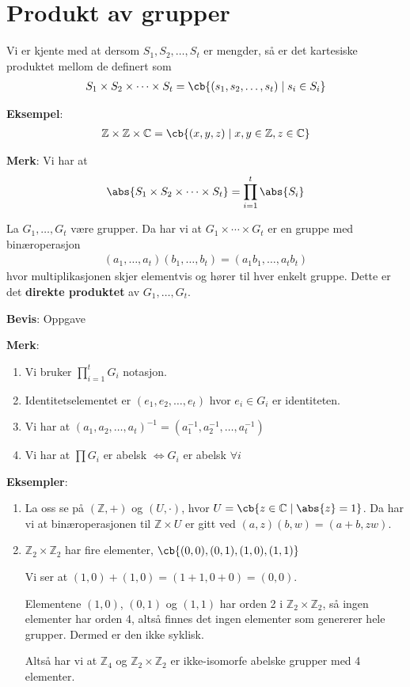 \section{Produkt av grupper}
Vi er kjente med at dersom $S_1, S_2, \dots, S_t$ er mengder, så er det kartesiske produktet
mellom de definert som
\begin{align}
	S_1\times S_2\times \cdots\times S_t = \cb{(s_1,s_2,\dots,s_t)\mid s_i\in S_i}
\end{align}

\textbf{Eksempel}:
\begin{align}
	\mathbb{Z}\times\mathbb{Z}\times\mathbb{C}=\cb{(x,y,z)\mid x,y\in\mathbb{Z}, z\in\mathbb{C}}
\end{align}

\textbf{Merk}: Vi har at
\begin{align}
	\abs{S_1\times S_2\times\cdots\times S_t}=\prod_{i=1}^t\abs{S_i}
\end{align}

\begin{theorem*}{11.2}{}
	La $G_1, \dots, G_t$ være grupper. Da har vi at $G_1\times\cdots\times G_t$ er en gruppe
	med binæroperasjon
	\begin{align}
		(a_1,\dots,a_t)(b_1,\dots,b_t)=(a_1b_1,\dots,a_tb_t)
	\end{align}
	hvor multiplikasjonen skjer elementvis og hører til hver enkelt gruppe. Dette er det
	\textbf{direkte produktet} av $G_1,\dots, G_t$.
\end{theorem*}

\textbf{Bevis}: Oppgave

\textbf{Merk}:
\begin{enumerate}
	\item Vi bruker $\prod_{i=1}^t G_i$ notasjon.
	\item Identitetselementet er $(e_1, e_2, \dots, e_t)$ hvor $e_i\in G_i$ er identiteten.
	\item Vi har at $(a_1, a_2, \dots, a_t)^{-1}=(a_1^{-1}, a_2^{-1},\dots, a_t^{-1})$
	\item Vi har at $\prod G_i$ er abelsk $\iff G_i$ er abelsk $\forall i$
\end{enumerate}

\textbf{Eksempler}:
\begin{enumerate}
	\item La oss se på $(\mathbb{Z}, +)$ og $(U,\cdot)$, hvor $U=\cb{z\in \mathbb{C}\mid\abs{z}=1}$.
	      Da har vi at binæroperasjonen til $\mathbb{Z}\times U$ er gitt ved $(a,z)(b,w)=(a+b,zw)$.
	\item $\mathbb{Z}_2\times \mathbb{Z}_2$ har fire elementer, $\cb{(0,0), (0,1), (1,0), (1,1)}$

	      Vi ser at $(1,0)+(1,0)=(1+1,0+0)=(0,0)$.

	      Elementene $(1,0)$, $(0,1)$ og $(1,1)$ har orden 2 i $\mathbb{Z}_2\times \mathbb{Z}_2$, så
	      ingen elementer har orden 4, altså finnes det ingen elementer som genererer hele grupper.
	      Dermed er den ikke syklisk.

	      Altså har vi at $\mathbb{Z}_4$ og $\mathbb{Z}_2\times \mathbb{Z}_2$ er ikke-isomorfe abelske
	      grupper med 4 elementer.
\end{enumerate}

